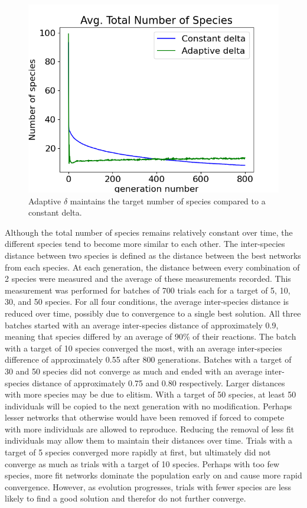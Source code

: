 \documentclass[12pt]{report}
\begin{document}
\begin{figure}
\centering
    \includegraphics[width=15cm]{images/adaptive_delta.png}
    \caption[Adaptive $\delta$ maintains the target number of species]{Adaptive $\delta$ maintains the target number of species compared to a constant delta.}
    \label{fig:adaptive_delta}
\end{figure}


Although the total number of species remains relatively constant over time, the different species tend to become more similar to each other. The inter-species distance between two species is defined as the distance between the best networks from each species. At each generation, the distance between every combination of 2 species were measured and the average of these measurements recorded. This measurement was performed for batches of 700 trials each for a target of 5, 10, 30, and 50 species. For all four conditions, the average inter-species distance is reduced over time, possibly due to convergence to a single best solution. All three batches started with an average inter-species distance of approximately 0.9, meaning that species differed by an average of 90\% of their reactions. The batch with a target of 10 species converged the most, with an average inter-species difference of approximately 0.55 after 800 generations.   Batches with a target of 30 and 50 species did not converge as much and ended with an average inter-species distance of approximately 0.75 and 0.80 respectively. Larger distances with more species may be due to elitism. With a target of 50 species, at least 50 individuals will be copied to the next generation with no modification. Perhaps lesser networks that otherwise would have been removed if forced to compete with more individuals are allowed to reproduce. Reducing the removal of less fit individuals may allow them to maintain their distances over time. Trials with a target of 5 species converged more rapidly at first, but ultimately did not converge as much as trials with a target of 10 species. Perhaps with too few species, more fit networks dominate the population early on and cause more rapid convergence. However, as evolution progresses, trials with fewer species are less likely to find a good solution and therefor do not further converge.
\end{document}
